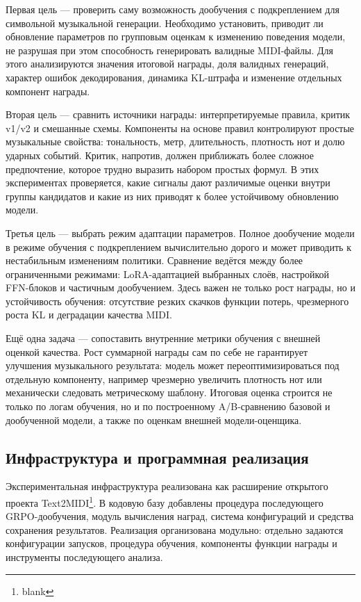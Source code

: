\documentclass[a4paper,12pt]{extarticle}
\begin{document}
Первая цель --- проверить саму возможность дообучения с подкреплением
для символьной музыкальной генерации. Необходимо установить, приводит ли
обновление параметров по групповым оценкам к изменению поведения модели,
не разрушая при этом способность генерировать валидные MIDI-файлы. Для
этого анализируются значения итоговой награды, доля
валидных генераций, характер ошибок декодирования, динамика KL-штрафа и
изменение отдельных компонент награды.

Вторая цель --- сравнить источники награды: интерпретируемые правила,
критик v1/v2 и смешанные схемы. Компоненты на основе правил
контролируют простые
музыкальные свойства: тональность, метр, длительность, плотность нот и
долю ударных событий. Критик, напротив, должен приближать более сложное
предпочтение, которое трудно выразить набором простых формул. В этих
экспериментах проверяется, какие сигналы дают различимые оценки
внутри группы кандидатов и какие из них приводят к более устойчивому
обновлению модели.

Третья цель --- выбрать режим адаптации параметров. Полное дообучение модели
в режиме обучения с подкреплением вычислительно дорого и может приводить к
нестабильным изменениям политики. Сравнение ведётся между более ограниченными
режимами: LoRA-адаптацией выбранных слоёв, настройкой FFN-блоков и частичным
дообучением. Здесь важен не только рост награды, но и устойчивость обучения:
отсутствие резких скачков функции потерь, чрезмерного роста KL и деградации
качества MIDI.

Ещё одна задача --- сопоставить внутренние метрики обучения с внешней оценкой
качества. Рост суммарной награды сам по себе
не гарантирует улучшения музыкального результата: модель может
переоптимизироваться под отдельную компоненту, например чрезмерно
увеличить плотность нот или механически следовать метрическому шаблону.
Итоговая оценка строится не только по логам обучения, но и по
построенному A/B-сравнению базовой и дообученной модели, а также по
оценкам внешней модели-оценщика.

\subsection{Инфраструктура и программная реализация}

Экспериментальная инфраструктура реализована как расширение открытого проекта
Text2MIDI\footnote{blank}. В кодовую базу добавлены процедура последующего
GRPO-дообучения, модуль вычисления наград, система конфигураций и средства
сохранения результатов. Реализация организована модульно: отдельно задаются
конфигурации запусков, процедура обучения, компоненты функции награды и
инструменты последующего анализа.
\end{document}
